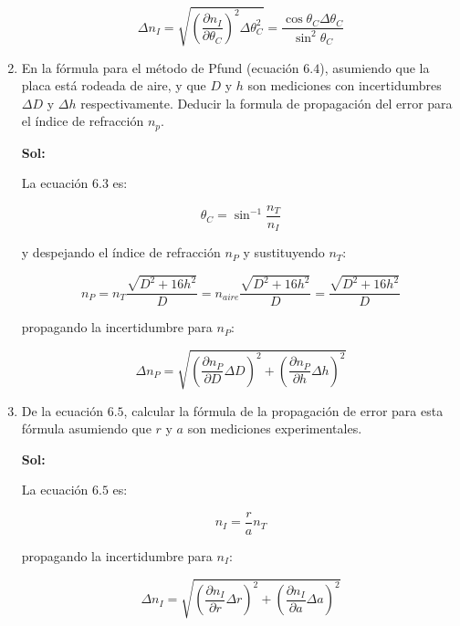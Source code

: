\documentclass[12pt,a4paper]{article}
\begin{document}
\begin{enumerate}
\begin{equation*}
    \Delta n_I= \sqrt{\left(\frac{\partial n_I}{\partial \theta_C}\right)^{2}\Delta \theta_{C}^{2}}= \frac{\cos{\theta_C}\Delta \theta_C}{\sin^{2}{\theta_C}}
\end{equation*}





\item En la fórmula para el método de Pfund (ecuación $6.4$), asumiendo que la placa está rodeada de aire, y que $D$ y $h$ son mediciones con incertidumbres $\Delta D$ y $\Delta h$ respectivamente. Deducir la formula de propagación del error para el índice de refracción $n_p$.

\textbf{Sol:}

La ecuación $6.3$ es:

\begin{equation*}
    \theta_C = \sin^{-1}{\frac{n_T}{n_I}}
\end{equation*}

y despejando el índice de refracción $n_P$ y sustituyendo $n_T$:

\begin{equation*}
    n_P = n_T \frac{\sqrt{D^2 + 16h^2}}{D}= n_{aire} \frac{\sqrt{D^2 + 16h^2}}{D}= \frac{\sqrt{D^2 + 16h^2}}{D}
\end{equation*}

propagando la incertidumbre para $n_P$:

\begin{equation*}
    \Delta n_P=\sqrt{\left(\frac{\partial n_P}{\partial D} \Delta D\right)^{2}+ \left(\frac{\partial n_P}{\partial h}\Delta h\right)^{2}}
\end{equation*}







\item De la ecuación $6.5$, calcular la fórmula de la propagación de error para esta fórmula asumiendo que $r$ y $a$ son mediciones experimentales.

\textbf{Sol:}

La ecuación $6.5$ es:

\begin{equation*}
    n_I = \frac{r}{a}n_T
\end{equation*}

propagando la incertidumbre para $n_I$:

\begin{equation*}
    \Delta n_I = \sqrt{\left(\frac{\partial n_I}{\partial r}\Delta r\right)^{2} + \left(\frac{\partial n_I}{\partial a}\Delta a\right)^{2}}
\end{equation*}


\end{enumerate}
\end{document}
